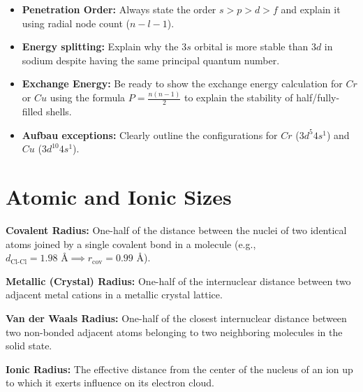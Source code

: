 \documentclass[12pt,a4paper]{article}
\begin{document}
\begin{tcolorbox}[exambox, title={Exam Points: Penetration and Configurations}]
  \begin{itemize}[leftmargin=*, itemsep=2pt, topsep=2pt]
    \item \textbf{Penetration Order:} Always state the order $s > p > d > f$ and explain it using radial node count ($n-l-1$).
    \item \textbf{Energy splitting:} Explain why the $3s$ orbital is more stable than $3d$ in sodium despite having the same principal quantum number.
    \item \textbf{Exchange Energy:} Be ready to show the exchange energy calculation for $Cr$ or $Cu$ using the formula $P = \frac{n(n-1)}{2}$ to explain the stability of half/fully-filled shells.
    \item \textbf{Aufbau exceptions:} Clearly outline the configurations for $Cr$ ($3d^5 4s^1$) and $Cu$ ($3d^{10} 4s^1$).
  \end{itemize}
\end{tcolorbox}

\section{Atomic and Ionic Sizes}

\begin{tcolorbox}[defbox, title={Definitions: Types of Radii}]
  \textbf{Covalent Radius:} One-half of the distance between the nuclei of two identical atoms joined by a single covalent bond in a molecule (e.g., $d_{\text{Cl-Cl}} = 1.98\text{ \AA} \implies r_{\text{cov}} = 0.99\text{ \AA}$).
  \par\vspace{4pt}
  \textbf{Metallic (Crystal) Radius:} One-half of the internuclear distance between two adjacent metal cations in a metallic crystal lattice.
  \par\vspace{4pt}
  \textbf{Van der Waals Radius:} One-half of the closest internuclear distance between two non-bonded adjacent atoms belonging to two neighboring molecules in the solid state.
  \par\vspace{4pt}
  \textbf{Ionic Radius:} The effective distance from the center of the nucleus of an ion up to which it exerts influence on its electron cloud.
\end{tcolorbox}
\end{document}
